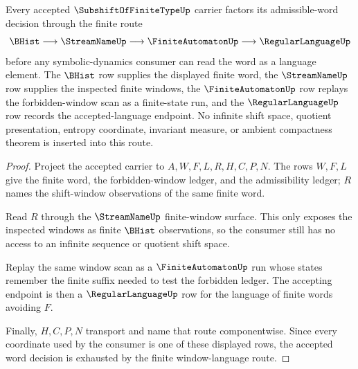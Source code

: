 \begin{theorem}
\label{thm:subshift-of-finite-type-window-language-route}
Every accepted $\SubshiftOfFiniteTypeUp$ carrier factors its admissible-word decision through the finite route
$$
\BHist \longrightarrow \StreamNameUp \longrightarrow \FiniteAutomatonUp \longrightarrow \RegularLanguageUp
$$
before any symbolic-dynamics consumer can read the word as a language element. The $\BHist$ row supplies the displayed finite word, the $\StreamNameUp$ row supplies the inspected finite windows, the $\FiniteAutomatonUp$ row replays the forbidden-window scan as a finite-state run, and the $\RegularLanguageUp$ row records the accepted-language endpoint. No infinite shift space, quotient presentation, entropy coordinate, invariant measure, or ambient compactness theorem is inserted into this route.
\end{theorem}
\begin{proof}
Project the accepted carrier to $A,W,F,L,R,H,C,P,N$. The rows $W,F,L$ give the finite word, the forbidden-window ledger, and the admissibility ledger; $R$ names the shift-window observations of the same finite word.

Read $R$ through the $\StreamNameUp$ finite-window surface. This only exposes the inspected windows as finite $\BHist$ observations, so the consumer still has no access to an infinite sequence or quotient shift space.

Replay the same window scan as a $\FiniteAutomatonUp$ run whose states remember the finite suffix needed to test the forbidden ledger. The accepting endpoint is then a $\RegularLanguageUp$ row for the language of finite words avoiding $F$.

Finally, $H,C,P,N$ transport and name that route componentwise. Since every coordinate used by the consumer is one of these displayed rows, the accepted word decision is exhausted by the finite window-language route.
\end{proof}

